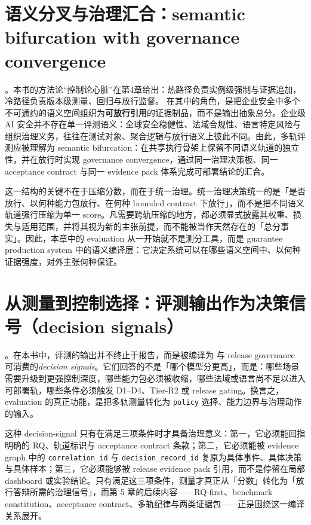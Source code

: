 \documentclass[11pt,a4paper]{report}
\begin{document}
\section{语义分叉与治理汇合：semantic bifurcation with governance convergence}
\EvalFramework{}。本书的方法论“控制论心脏”在第4章给出：热路径负责实例级强制与证据追加，冷路径负责版本级测量、回归与放行监督。\EvalFramework{} 在其中的角色，是把企业安全中多个不可通约的语义空间组织为\textbf{可放行引用}的证据制品，而不是输出抽象总分。企业级 AI 安全并不存在单一评测语义：全球安全稳健性、法域合规性、语言特定风险与组织治理义务，往往在测试对象、聚合逻辑与放行语义上彼此不同。由此，多轨评测应被理解为 semantic bifurcation：在共享执行骨架上保留不同语义轨道的独立性，并在放行时实现 governance convergence，通过同一治理决策板、同一 acceptance contract 与同一 evidence pack 体系完成可部署结论的汇合。

这一结构的关键不在于压缩分数，而在于统一治理。统一治理决策统一的是「是否放行、以何种能力包放行、在何种 bounded contract 下放行」，而不是把不同语义轨道强行压缩为单一 score。凡需要跨轨压缩的地方，都必须显式披露其权重、损失与适用范围，并将其视为新的主张前提，而不能被当作天然存在的「总分事实」。因此，本章中的 evaluation 从一开始就不是测分工具，而是 guarantee production system 中的语义编译层：它决定系统可以在哪些语义空间中、以何种证据强度，对外主张何种保证。

\section{从测量到控制选择：评测输出作为决策信号（decision signals）}
\EvalFramework{}。在本书中，评测的输出并不终止于报告，而是被编译为 \ControlPlane{} 与 release governance 可消费的\emph{decision signals}。它们回答的不是「哪个模型分更高」，而是：哪些场景需要升级到更强控制深度，哪些能力包必须被收缩，哪些法域或语言尚不足以进入可部署轨，哪些条件必须触发 D1--D4、Tier-R2 或 release gating。换言之，evaluation 的真正功能，是把多轨测量转化为 \texttt{policy} 选择、能力边界与治理动作的输入。

这种 decision-signal 只有在满足三项条件时才具备治理意义：第一，它必须能回指明确的 RQ、轨道标识与 acceptance contract 条款；第二，它必须能被 evidence graph 中的 \texttt{correlation\_id} 与 \texttt{decision\_record\_id} 复原为具体事件、具体决策与具体样本；第三，它必须能够被 release evidence pack 引用，而不是停留在局部 dashboard 或实验结论。只有满足这三项条件，测量才真正从「分数」转化为「放行答辩所需的治理信号」，而第 5 章的后续内容——RQ-first、benchmark constitution、acceptance contract、多轨纪律与两类证据包——正是围绕这一编译关系展开。
\end{document}
